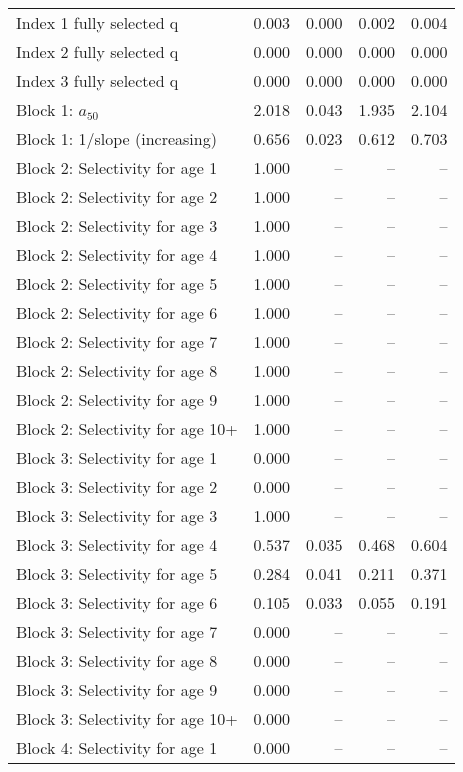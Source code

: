 \documentclass[
]{article}
\begin{document}
\begin{landscape}
\begin{longtable}[t]{lrrrr}
\endfoot
\bottomrule
\endlastfoot
Index 1 fully selected q & 0.003 & 0.000 & 0.002 & 0.004\\
Index 2 fully selected q & 0.000 & 0.000 & 0.000 & 0.000\\
Index 3 fully selected q & 0.000 & 0.000 & 0.000 & 0.000\\
Block 1: $a_{50}$ & 2.018 & 0.043 & 1.935 & 2.104\\
Block 1: 1/slope (increasing) & 0.656 & 0.023 & 0.612 & 0.703\\
\addlinespace
Block 2: Selectivity for age 1 & 1.000 & -- & -- & --\\
Block 2: Selectivity for age 2 & 1.000 & -- & -- & --\\
Block 2: Selectivity for age 3 & 1.000 & -- & -- & --\\
Block 2: Selectivity for age 4 & 1.000 & -- & -- & --\\
Block 2: Selectivity for age 5 & 1.000 & -- & -- & --\\
\addlinespace
Block 2: Selectivity for age 6 & 1.000 & -- & -- & --\\
Block 2: Selectivity for age 7 & 1.000 & -- & -- & --\\
Block 2: Selectivity for age 8 & 1.000 & -- & -- & --\\
Block 2: Selectivity for age 9 & 1.000 & -- & -- & --\\
Block 2: Selectivity for age 10+ & 1.000 & -- & -- & --\\
\addlinespace
Block 3: Selectivity for age 1 & 0.000 & -- & -- & --\\
Block 3: Selectivity for age 2 & 0.000 & -- & -- & --\\
Block 3: Selectivity for age 3 & 1.000 & -- & -- & --\\
Block 3: Selectivity for age 4 & 0.537 & 0.035 & 0.468 & 0.604\\
Block 3: Selectivity for age 5 & 0.284 & 0.041 & 0.211 & 0.371\\
\addlinespace
Block 3: Selectivity for age 6 & 0.105 & 0.033 & 0.055 & 0.191\\
Block 3: Selectivity for age 7 & 0.000 & -- & -- & --\\
Block 3: Selectivity for age 8 & 0.000 & -- & -- & --\\
Block 3: Selectivity for age 9 & 0.000 & -- & -- & --\\
Block 3: Selectivity for age 10+ & 0.000 & -- & -- & --\\
\addlinespace
Block 4: Selectivity for age 1 & 0.000 & -- & -- & --\\

\end{longtable}
\end{landscape}
\end{document}
